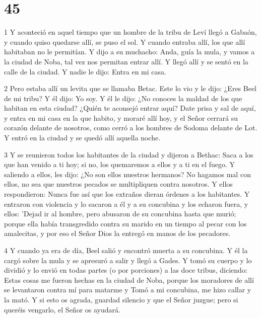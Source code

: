 \chapter{45}

\par 1 Y aconteció en aquel tiempo que un hombre de la tribu de Leví llegó a Gabaón, y cuando quiso quedarse allí, se puso el sol. Y cuando entraba allí, los que allí habitaban no le permitían. Y dijo a su muchacho: Anda, guía la mula, y vamos a la ciudad de Noba, tal vez nos permitan entrar allí. Y llegó allí y se sentó en la calle de la ciudad. Y nadie le dijo: Entra en mi casa.

\par 2 Pero estaba allí un levita que se llamaba Betac. Este lo vio y le dijo: ¿Eres Beel de mi tribu? Y él dijo: Yo soy. Y él le dijo: ¿No conoces la maldad de los que habitan en esta ciudad? ¿Quién te aconsejó entrar aquí? Date prisa y sal de aquí, y entra en mi casa en la que habito, y moraré allí hoy, y el Señor cerrará su corazón delante de nosotros, como cerró a los hombres de Sodoma delante de Lot. Y entró en la ciudad y se quedó allí aquella noche.

\par 3 Y se reunieron todos los habitantes de la ciudad y dijeron a Bethac: Saca a los que han venido a ti hoy; si no, los quemaremos a ellos y a ti en el fuego. Y saliendo a ellos, les dijo: ¿No son ellos nuestros hermanos? No hagamos mal con ellos, no sea que nuestros pecados se multipliquen contra nosotros. Y ellos respondieron: Nunca fue así que los extraños dieran órdenes a los habitantes. Y entraron con violencia y lo sacaron a él y a su concubina y los echaron fuera, y ellos: 'Dejad ir al hombre, pero abusaron de su concubina hasta que murió; porque ella había transgredido contra su marido en un tiempo al pecar con los amalecitas, y por eso el Señor Dios la entregó en manos de los pecadores.

\par 4 Y cuando ya era de día, Beel salió y encontró muerta a su concubina. Y él la cargó sobre la mula y se apresuró a salir y llegó a Gades. Y tomó su cuerpo y lo dividió y lo envió en todas partes (o por porciones) a las doce tribus, diciendo: Estas cosas me fueron hechas en la ciudad de Noba, porque los moradores de allí se levantaron contra mí para matarme y Tomó a mi concubina, me hizo callar y la mató. Y si esto os agrada, guardad silencio y que el Señor juzgue; pero si queréis vengarlo, el Señor os ayudará.

